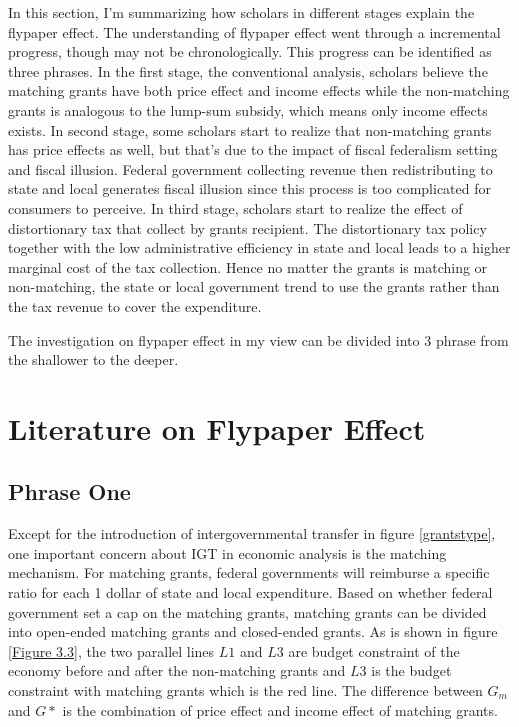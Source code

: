 In this section, I'm summarizing how scholars in different stages explain the flypaper effect. The understanding of flypaper effect went through a incremental progress, though may not be chronologically. This progress can be identified as three phrases. In the first stage, the conventional analysis, scholars believe the matching grants have both price effect and income effects while the non-matching grants is analogous to the lump-sum subsidy, which means only income effects exists. In second stage, some scholars start to realize that non-matching grants has price effects as well, but that's due to the impact of fiscal federalism setting and fiscal illusion. Federal government collecting revenue then redistributing to state and local generates fiscal illusion since this process is too complicated for consumers to perceive. In third stage, scholars start to realize the effect of distortionary tax that collect by grants recipient. The distortionary tax policy together with the low administrative efficiency in state and local leads to a higher marginal cost of the tax collection. Hence no matter the grants is matching or non-matching, the state or local government trend to use the grants rather than the tax revenue to cover the expenditure.

The investigation on flypaper effect in my view can be divided into 3 phrase from the shallower to the deeper.

\section{Literature on Flypaper Effect}
\subsection{Phrase One}

Except for the introduction of intergovernmental transfer in figure \ref*{grantstype}, one important concern about IGT in economic analysis is the matching mechanism. For matching grants, federal governments will reimburse a specific ratio for each 1 dollar of state and local expenditure. Based on whether federal government set a cap on the matching grants, matching grants can be divided into open-ended matching grants and closed-ended grants.
As is shown in figure \ref{Figure 3.3}, the two parallel lines $L1$ and $L3$ are budget constraint of the economy before and after the non-matching grants and $L3$ is the budget constraint with matching grants which is the red line. The difference between $G_m$ and $G*$ is the combination of price effect and income effect of matching grants.

